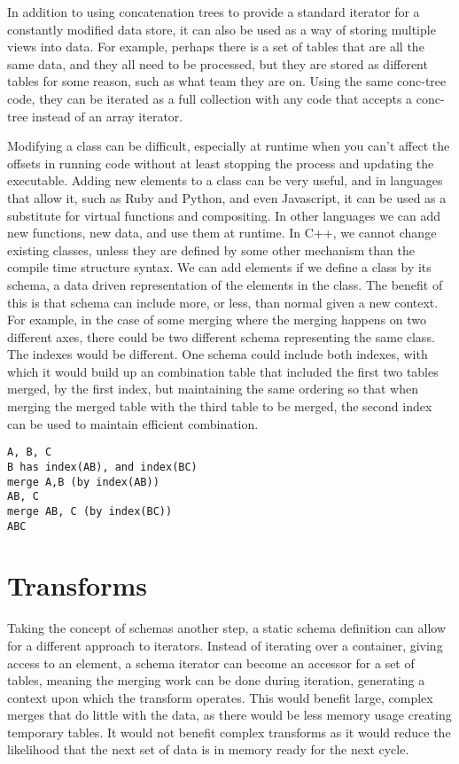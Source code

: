 In addition to using concatenation trees to provide a standard iterator for a
constantly modified data store, it can also be used as a way of storing
multiple views into data. For example, perhaps there is a set of tables that
are all the same data, and they all need to be processed, but they are stored
as different tables for some reason, such as what team they are on. Using the
same conc-tree code, they can be iterated as a full collection with any code
that accepts a conc-tree instead of an array iterator.

Modifying a class can be difficult, especially at runtime when you can't
affect the offsets in running code without at least stopping the process and
updating the executable. Adding new elements to a class can be very useful, and
in languages that allow it, such as Ruby and Python, and even Javascript, it
can be used as a substitute for virtual functions and compositing. In other
languages we can add new functions, new data, and use them at runtime. In C++,
we cannot change existing classes, unless they are defined by some other
mechanism than the compile time structure syntax. We can add elements if we
define a class by its schema, a data driven representation of the elements in
the class. The benefit of this is that schema can include more, or less, than
normal given a new context. For example, in the case of some merging where the
merging happens on two different axes, there could be two different schema
representing the same class.  The indexes would be different. One schema could
include both indexes, with which it would build up an combination table that
included the first two tables merged, by the first index, but maintaining the
same ordering so that when merging the merged table with the third table to be
merged, the second index can be used to maintain efficient combination.

\begin{verbatim}
A, B, C
B has index(AB), and index(BC)
merge A,B (by index(AB))
AB, C
merge AB, C (by index(BC))
ABC
\end{verbatim}

\section{Transforms}

Taking the concept of schemas another step, a static schema definition can
allow for a different approach to iterators. Instead of iterating over a
container, giving access to an element, a schema iterator can become an
accessor for a set of tables, meaning the merging work can be done during
iteration, generating a context upon which the transform operates. This would
benefit large, complex merges that do little with the data, as there would be
less memory usage creating temporary tables. It would not benefit complex
transforms as it would reduce the likelihood that the next set of data is in
memory ready for the next cycle.

